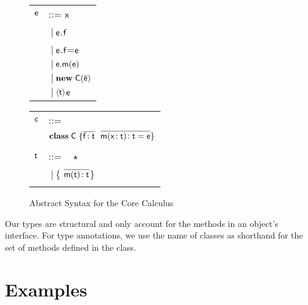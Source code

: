 \documentclass{sigplanconf}
\newcommand{\M}[1]{\ensuremath{#1}\xspace}
\newcommand{\xt}[1]{\sf{#1}}
\newcommand{\bt}[1]{\xt{\bf #1}}
\newcommand{\any}{\M{\star}}
\newcommand{\cast}[1]{\M{\langle #1\rangle}}
\renewcommand{\t}{\M{\xt{t}}}
\newcommand{\B}{\M{~|~}}
\newcommand{\new}{\M{\bt{new}}}
\newcommand{\NEW}[2]{\M{\new\;#1(#2)}}
\newcommand{\CALL}[3]{\M{#1.#2(#3)}}
\renewcommand{\bar}[1]{\M{\overline{ #1} }}
\newcommand{\m}{\M{\xt{m}}}
\newcommand{\e}{\M{\xt{e}}}
\newcommand{\f}{\M{\xt{f}}}
\newcommand{\x}{\M{\xt{x}}}
\newcommand{\C}{\M{\xt{C}}}
\newcommand{\D}{\M{\xt{D}}}
\newcommand{\cl}{\M{\xt{c}}}
\newcommand{\CLASS}[3]{ \M{\bt{class}\;#1\;\{ #3 \}}}
\newcommand{\MDEF}[4] {\NT{#1(#2)}{#3} = #4}
\newcommand{\NT}[2]{#1\!: #2}
\begin{document}
\begin{figure}[!h]
\begin{minipage}{3cm}\begin{tabular}{ll}
\e &::=  \x \\
   &\B \e.\f \\
   &\B \e.\f=\e\\
   &\B \CALL\e\m\e \\
   &\B \NEW\C{\bar{\e}}\\
   &\B \cast{\t}\e \\
\end{tabular}\end{minipage}\begin{minipage}{3cm}\begin{tabular}{ll}
\cl &::= \\
  &\CLASS \C {\bar\D}{\bar{\NT\f\t} ~~ \bar{\MDEF\m{\NT\x\t}\t\e}}\\
\\
\t &::= ~ \any \\
   &\B \{ \bar{\NT{\m(\t)}\t}\}\\
\\
\end{tabular}\end{minipage}
\caption{Abstract Syntax for the Core Calculus}\label{syn}
\end{figure}

Our types are structural and only account for the methods in an object's
interface. For type annotations, we use the name of classes as shorthand for
the set of methods defined in the class.



\section{Examples}

\newcommand{\tp}[1]{\M{\t_{#1}}}
\renewcommand{\mp}[1]{\M{\m_{#1}}}
\end{document}
